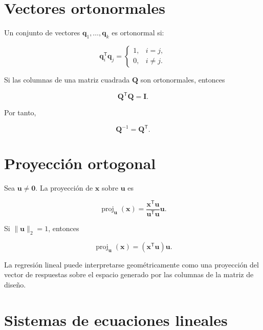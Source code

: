 \documentclass[
  spanish,
  10.5pt,
  letterpaper,
  DIV=11,
  numbers=noendperiod,
  oneside,
  open=any]{scrreprt}
\theoremstyle{definition}
\theoremstyle{definition}
\theoremstyle{plain}
\theoremstyle{remark}
\begin{document}
\section*{Vectores ortonormales}\label{vectores-ortonormales}


Un conjunto de vectores \(\mathbf{q}_1,\ldots,\mathbf{q}_k\) es
ortonormal si:

\[
\mathbf{q}_i^{\mathsf T}\mathbf{q}_j
=
\begin{cases}
1, & i=j,\\
0, & i\neq j.
\end{cases}
\]

Si las columnas de una matriz cuadrada \(\mathbf{Q}\) son ortonormales,
entonces

\[
\mathbf{Q}^{\mathsf T}\mathbf{Q}
=
\mathbf{I}.
\]

Por tanto,

\[
\mathbf{Q}^{-1}
=
\mathbf{Q}^{\mathsf T}.
\]

\section*{Proyección ortogonal}\label{proyecciuxf3n-ortogonal}


Sea \(\mathbf{u}\neq\mathbf{0}\). La proyección de \(\mathbf{x}\) sobre
\(\mathbf{u}\) es

\[
\operatorname{proj}_{\mathbf{u}}(\mathbf{x})
=
\frac{
\mathbf{x}^{\mathsf T}\mathbf{u}
}{
\mathbf{u}^{\mathsf T}\mathbf{u}
}
\mathbf{u}.
\]

Si \(\|\mathbf{u}\|_2=1\), entonces

\[
\operatorname{proj}_{\mathbf{u}}(\mathbf{x})
=
(\mathbf{x}^{\mathsf T}\mathbf{u})\mathbf{u}.
\]

La regresión lineal puede interpretarse geométricamente como una
proyección del vector de respuestas sobre el espacio generado por las
columnas de la matriz de diseño.

\section*{Sistemas de ecuaciones
lineales}\label{sistemas-de-ecuaciones-lineales}
\end{document}
